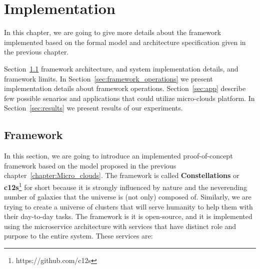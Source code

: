 \chapter{Implementation}\label{chapter:Implementation}
%
In this chapter, we are going to give more details about the framework implemented based on the formal model and architecture specification given in the previous chapter.

Section~\ref{sec:framework} framework architecture, and system implementation details, and framework limits. In Section~\ref{sec:framework_operations} we present implementation details about framework operations. Section~\ref{sec:app} describe few possible senarios and applications that could utilize micro-clouds platform. In Section~\ref{sec:results} we present results of our experiments.
%
%
\section{Framework}\label{sec:framework}
%
In this section, we are going to introduce an implemented proof-of-concept framework based on the model proposed in the previous chapter~\ref{chapter:Micro_clouds}. The framework is called \textbf{Constellations} or \textbf{c12s}\footnote{https://github.com/c12s} for short because it is strongly influenced by nature and the neverending number of galaxies that the universe is (not only) composed of. Similarly, we are trying to create a universe of clusters that will serve humanity to help them with their day-to-day tasks. The framework is it is open-source, and it is implemented using the microservice architecture with services that have distinct role and purpose to the entire system. These services are:

